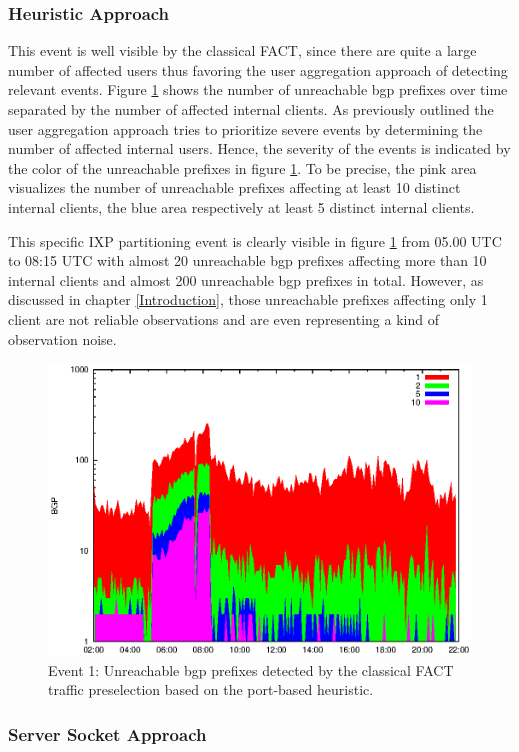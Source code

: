 \subsubsection{Heuristic Approach} This event is well visible by the classical \gls{FACT}, since there are quite a large number of affected users thus favoring the user aggregation approach of detecting relevant events. 
Figure \ref{fig:AMS_IX_FACT_REF} shows the number of unreachable \gls{bgp} prefixes over time separated by the number of affected internal clients. 
As previously outlined the user aggregation approach tries to prioritize severe events by determining the number of affected internal users. 
Hence, the severity of the events is indicated by the color of the unreachable prefixes in figure \ref{fig:AMS_IX_FACT_REF}. 
To be precise, the pink area visualizes the number of unreachable prefixes affecting at least 10 distinct internal clients, the blue area respectively at least 5 distinct internal clients.

This specific IXP partitioning event is clearly visible in figure \ref{fig:AMS_IX_FACT_REF} from 05.00 UTC to 08:15 UTC with almost 20 unreachable \gls{bgp} prefixes affecting more than 10 internal clients and almost 200 unreachable \gls{bgp} prefixes in total. 
However, as discussed in chapter \ref{Introduction}, those unreachable prefixes affecting only 1 client are not reliable observations and are even representing a kind of observation noise. 
\begin{figure}
	[p] \centering 
	\includegraphics[width=0.75\linewidth]{images/events/2010_03_25/bgp_log_port80_ref.eps} \caption{Event 1: Unreachable \gls{bgp} prefixes detected by the classical \gls{FACT} traffic preselection based on the port-based heuristic.} 
	\label{fig:AMS_IX_FACT_REF} 
\end{figure}

\subsubsection{Server Socket Approach}

